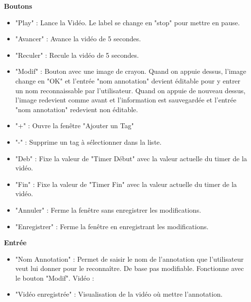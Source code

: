 \documentclass[11pt,french,a4paper]{report}
\begin{document}
\large \textbf{Boutons}\normalsize
    \begin{itemize}[label=, leftmargin=*,parsep=0cm,itemsep=0cm,topsep=0cm]
        \item "Play" : Lance la Vidéo. Le label se change en "stop" pour mettre en pause.
        \item "Avancer" : Avance la vidéo de 5 secondes.
        \item "Reculer" : Recule la vidéo de 5 secondes.
        \item "Modif" : Bouton avec une image de crayon. Quand on appuie dessus, l'image change en "OK" et l'entrée "nom annotation" devient éditable
        pour y entrer un nom reconnaissable par l'utilisateur. Quand on appuie de nouveau dessus, l'image redevient comme avant et
        l'information est sauvegardée et l'entrée "nom annotation" redevient non éditable.
        \item "+" : Ouvre la fenêtre "Ajouter un Tag"
        \item "-" : Supprime un tag à sélectionner dans la liste.
        \item "Deb" : Fixe la valeur de "Timer Début" avec la valeur actuelle du timer de la vidéo.
        \item "Fin" : Fixe la valeur de "Timer Fin" avec la valeur actuelle du timer de la vidéo.
        \item "Annuler" : Ferme la fenêtre sans enregistrer les modifications.
        \item "Enregistrer" : Ferme la fenêtre en enregistrant les modifications.
    \end{itemize}
\large \textbf{Entrée}\normalsize
    \begin{itemize}[label=, leftmargin=*,parsep=0cm,itemsep=0cm,topsep=0cm]
        \item "Nom Annotation" : Permet de saisir le nom de l'annotation que l'utilisateur veut lui donner pour le reconnaître.
        De base pas modifiable. Fonctionne avec le bouton "Modif".
        Vidéo :
        \item "Vidéo enregistrée" : Visualisation de la vidéo où mettre l'annotation.
    \end{itemize}
\end{document}

